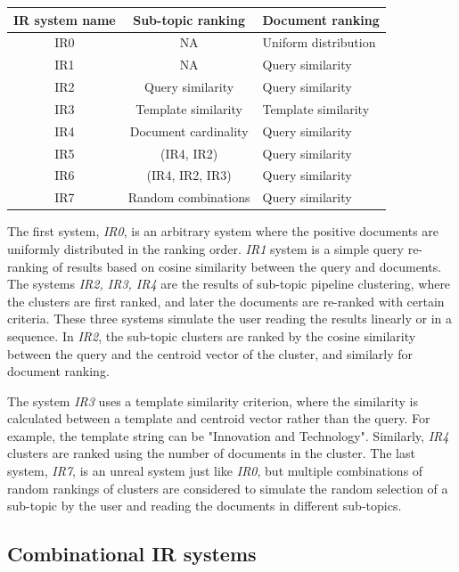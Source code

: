 \begin{center}
	\label{tab:ir_systems}
	\begin{tabularx}{0.8\textwidth}{|c|c|Y|}
		\hline
		 IR system name & Sub-topic ranking & Document ranking \\
		\hline
		 IR0 & NA & Uniform distribution \\
		\hline
		 IR1 & NA & Query similarity \\
		\hline
		 IR2 & Query similarity & Query similarity \\
		\hline
		 IR3 & Template similarity & Template similarity \\
		\hline
		 IR4 & Document cardinality & Query similarity \\
		\hline
		 IR5 & (IR4, IR2) & Query similarity \\
		\hline
		 IR6 & (IR4, IR2, IR3) & Query similarity \\
		\hline
		 IR7 & Random combinations & Query similarity \\
		\hline
	\end{tabularx}
\end{center}

The first system, \textit{IR0}, is an arbitrary system where the positive documents are uniformly distributed in the ranking order. \textit{IR1} system is a simple query re-ranking of results based on cosine similarity between the query and documents. The systems \textit{IR2, IR3, IR4} are the results of sub-topic pipeline clustering, where the clusters are first ranked, and later the documents are re-ranked with certain criteria. These three systems simulate the user reading the results linearly or in a sequence. In \textit{IR2}, the sub-topic clusters are ranked by the cosine similarity between the query and the centroid vector of the cluster, and similarly for document ranking.


The system \textit{IR3} uses a template similarity criterion, where the similarity is calculated between a template and centroid vector rather than the query. For example, the template string can be "Innovation and Technology". Similarly, \textit{IR4} clusters are ranked using the number of documents in the cluster. The last system, \textit{IR7}, is an unreal system just like \textit{IR0}, but multiple combinations of random rankings of clusters are considered to simulate the random selection of a sub-topic by the user and reading the documents in different sub-topics.


\subsection{Combinational IR systems}

